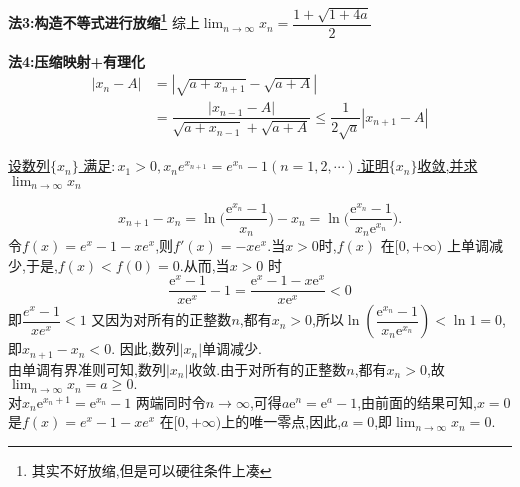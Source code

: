 \documentclass[8pt a4paper, oneside, UTF8]{ctexbook}
\begin{document}
\begin{sloppypar}
\begin{solution}{\textbf{法3:构造不等式进行放缩\footnote{其实不好放缩,但是可以硬往条件上凑}}}
        综上$\lim_{n\to \infty}x_n=\dfrac{1+\sqrt{1+4a}}{2}$
        \end{solution}
        \begin{solution}{\textbf{法4:压缩映射+有理化}}
            \begin{align*}
              |x_n -A| & = |\sqrt{a+x_{n+1}}-\sqrt{a+A}|\\
              & = \dfrac{|x_{n-1}-A|}{\sqrt{a+x_{n-1}}+\sqrt{a+A}} \leqslant \dfrac{1}{2\sqrt{a}}|x_{n+1}-A|
            \end{align*}
        \end{solution}
    \begin{problem}
        \uline{设数列$\{x_n\}$ 满足$:x_1>0,x_ne^{x_{n+1}}=e^{x_n}-1(n=1,2,\cdots)$.证明$\{x_n\}$收敛,并求$\lim_{n\to\infty} x_n$ }    
    \end{problem}
    \begin{solution}
        $$ 
           x_{n+1} - x_{n} = \ln\biggl(\frac{\mathrm{e}^{x_{n}} - 1}{x_{n}}\biggr)- x_{n} = \ln\biggl(\frac{\mathrm{e}^{x_{n}} - 1}{x_{n}\mathrm{e}^{x_{n}}}\biggr).
        $$
        令$f(x)=e^x-1-xe^x$,则$f'(x)=-xe^x$.当$x>0$时,$f(x)$ 在$[0,+\infty)$ 上单调减少,于是,$f(x)<f\left(0\right)=0.$从而,当$x>0$ 时
        $$
            \dfrac{\mathrm{e}^x-1}{x\mathrm{e}^x}-1 = \dfrac{\mathrm{e}^x-1-x\mathrm{e}^x}{x\mathrm{e}^x}<0
        $$即$\dfrac{e^x-1}{xe^x}<1$
        又因为对所有的正整数$n$,都有$x_n>0$,所以$\ln\left(\dfrac{\mathrm{e}^{x_n}-1}{x_n\mathrm{e}^{x_n}}\right)<\ln1=0$,即$x_{n+1}-x_n<0.$ 因此,数列$|x_n|$单调减少.\\
        由单调有界准则可知,数列$|x_n|$收敛.由于对所有的正整数$n$,都有$x_n>0$,故$\lim_{n\to\infty}x_n=a\geqslant0.$\\
        对$x_n\mathrm{e}^{x_n+1}=\mathrm{e}^{x_n}-1$ 两端同时令$n\to\infty$,可得$a\mathrm{e}^n=\mathrm{e}^a-1$,由前面的结果可知,$x=0$ 是$f(x)=e^x-1-xe^x$ 在$[0,+\infty)$上的唯一零点,因此,$a=0$,即$\lim_{n\to \infty}x_n=0.$
    \end{solution}
    \ifx\allfiles\undefined
\end{sloppypar}
\end{document}
